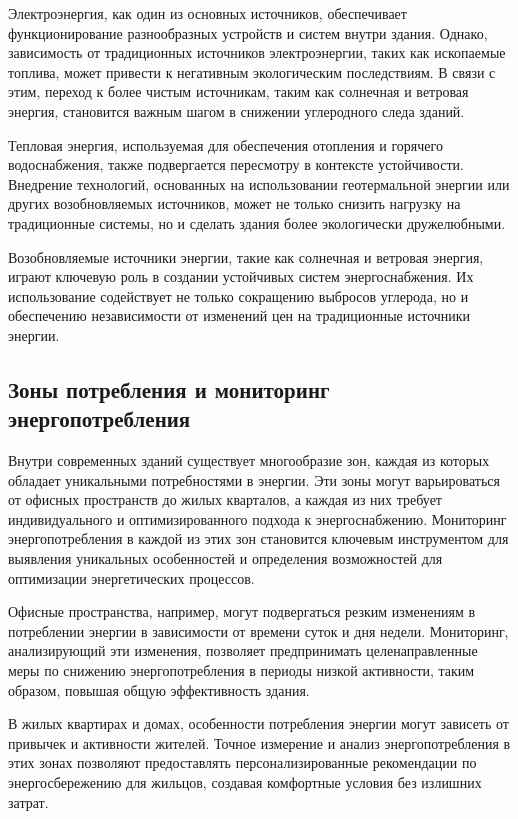 Электроэнергия, как один из основных источников, обеспечивает функционирование разнообразных устройств и систем внутри здания. Однако, зависимость от традиционных источников электроэнергии, таких как ископаемые топлива, может привести к негативным экологическим последствиям. В связи с этим, переход к более чистым источникам, таким как солнечная и ветровая энергия, становится важным шагом в снижении углеродного следа зданий.

Тепловая энергия, используемая для обеспечения отопления и горячего водоснабжения, также подвергается пересмотру в контексте устойчивости. Внедрение технологий, основанных на использовании геотермальной энергии или других возобновляемых источников, может не только снизить нагрузку на традиционные системы, но и сделать здания более экологически дружелюбными.

Возобновляемые источники энергии, такие как солнечная и ветровая энергия, играют ключевую роль в создании устойчивых систем энергоснабжения. Их использование содействует не только сокращению выбросов углерода, но и обеспечению независимости от изменений цен на традиционные источники энергии.

\subsection{Зоны потребления и мониторинг энергопотребления}

Внутри современных зданий существует многообразие зон, каждая из которых обладает уникальными потребностями в энергии. Эти зоны могут варьироваться от офисных пространств до жилых кварталов, а каждая из них требует индивидуального и оптимизированного подхода к энергоснабжению. Мониторинг энергопотребления в каждой из этих зон становится ключевым инструментом для выявления уникальных особенностей и определения возможностей для оптимизации энергетических процессов.

Офисные пространства, например, могут подвергаться резким изменениям в потреблении энергии в зависимости от времени суток и дня недели. Мониторинг, анализирующий эти изменения, позволяет предпринимать целенаправленные меры по снижению энергопотребления в периоды низкой активности, таким образом, повышая общую эффективность здания.

В жилых квартирах и домах, особенности потребления энергии могут зависеть от привычек и активности жителей. Точное измерение и анализ энергопотребления в этих зонах позволяют предоставлять персонализированные рекомендации по энергосбережению для жильцов, создавая комфортные условия без излишних затрат.

